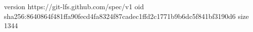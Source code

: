 version https://git-lfs.github.com/spec/v1
oid sha256:8640864f481ffa90fecd4fa8324f87cadec1ffd2c1771b9b6dc5f841bf3190d6
size 1344
